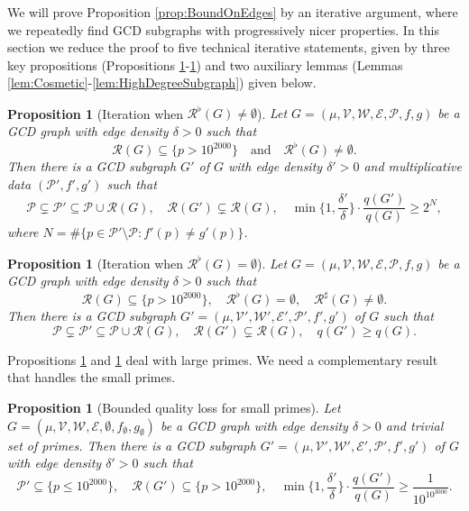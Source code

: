 \documentclass[12pt]{amsart}
\numberwithin{equation}{section}
\newtheorem{prop}[lem]{Proposition}
\theoremstyle{definition}
\theoremstyle{remark}
\newcommand{\CE}{\mathcal{E}}
\newcommand{\CP}{\mathcal{P}}
\newcommand{\CR}{\mathcal{R}}
\newcommand{\CV}{\mathcal{V}}
\newcommand{\CW}{\mathcal{W}}
\renewcommand{\le}{\leqslant}
\renewcommand{\ge}{\geqslant}
\begin{document}
We will prove Proposition \ref{prop:BoundOnEdges} by an iterative argument, where we repeatedly find GCD subgraphs with progressively nicer properties. In this section we reduce the proof to five technical iterative statements, given by three key propositions (Propositions \ref{prop:IterationStep1}-\ref{prop:SmallPrimes}) and two auxiliary lemmas (Lemmas \ref{lem:Cosmetic}-\ref{lem:HighDegreeSubgraph}) given below.

\begin{prop}[Iteration when $\CR^\flat(G)\ne\emptyset$]\label{prop:IterationStep1}
Let $G=(\mu,\CV,\CW,\CE,\CP,f,g)$ be a GCD graph with edge density $\delta>0$ such that 
\[
\CR(G)\subseteq\{p>10^{2000}\}\quad\text{and}\quad \CR^\flat(G)\neq\emptyset.
\] 
Then there is a GCD subgraph $G'$ of $G$ with edge density $\delta'>0$ and multiplicative data $(\CP',f',g')$ such that
	\[
	\CP\subsetneq\CP'\subseteq\CP\cup\CR(G),
	\quad
	\CR(G')\subsetneq \CR(G),
	\quad 
	\min\bigg\{1,\frac{\delta'}{\delta}\bigg\} \cdot \frac{q(G')}{q(G)}\ge 2^N ,
	\]
	where $N=\#\{p\in\CP'\setminus \CP:f'(p)\neq g'(p)\}$.
\end{prop}



\begin{prop}[Iteration when $\CR^\flat(G)=\emptyset$]\label{prop:IterationStep2}
Let $G=(\mu,\CV,\CW,\CE,\CP,f,g)$ be a GCD graph with edge density $\delta>0$ such that 
\[
\CR(G)\subseteq\{p> 10^{2000}\},
\quad
\CR^\flat(G)=\emptyset ,
\quad
\CR^\sharp(G)\neq\emptyset.
\] 
Then there is a GCD subgraph $G'=(\mu,\CV',\CW',\CE',\CP',f',g')$ of $G$ such that
\[
	\CP\subsetneq\CP'\subseteq\CP\cup\CR(G),
\quad
\CR(G')\subsetneq \CR(G),
\quad 
q(G')\ge q(G).
\]
\end{prop}

Propositions \ref{prop:IterationStep1} and \ref{prop:IterationStep2} deal with large primes. We need a complementary result that handles the small primes.

\begin{prop}[Bounded quality loss for small primes]\label{prop:SmallPrimes}
Let $G=(\mu,\CV,\CW,\CE,\emptyset,f_\emptyset,g_\emptyset)$ be a GCD graph with edge density $\delta>0$ and trivial set of primes. Then there is a GCD subgraph $G'=(\mu,\CV',\CW',\CE',\CP',f',g')$ of $G$ with edge density $\delta'>0$ such that
\[
\CP'\subseteq\{p\le 10^{2000}\},
\quad
\CR(G')\subseteq\{p> 10^{2000}\},
\quad
\min\bigg\{1,\frac{\delta'}{\delta}\bigg\} \cdot \frac{q(G')}{q(G)}\ge \frac{1}{10^{10^{3000}}} .
\]
\end{prop}
\end{document}
